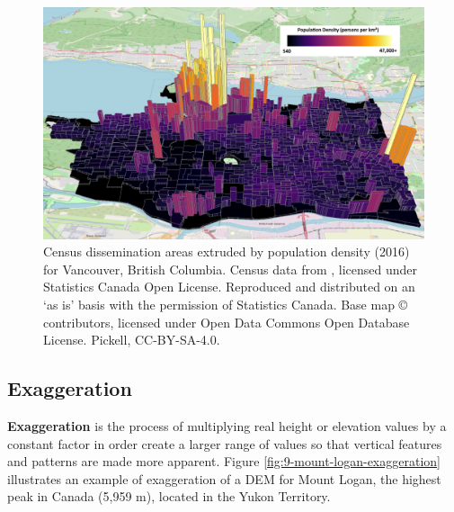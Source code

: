 \documentclass[
]{book}
\begin{document}
\begin{figure}
\includegraphics[width=0.75\linewidth]{images/09-vancouver-population-density-2016} \caption{Census dissemination areas extruded by population density (2016) for Vancouver, British Columbia. Census data from \citep{government_of_canada_focus_2017}, licensed under Statistics Canada Open License. Reproduced and distributed on an `as is' basis with the permission of Statistics Canada. Base map © \citep{openstreetmap_notitle_nodate} contributors, licensed under Open Data Commons Open Database License. Pickell, CC-BY-SA-4.0.}\label{fig:9-vancouver-population-density-2016}
\end{figure}

\subsection{Exaggeration}\label{exaggeration}

\textbf{Exaggeration} is the process of multiplying real height or elevation values by a constant factor in order create a larger range of values so that vertical features and patterns are made more apparent. Figure \ref{fig:9-mount-logan-exaggeration} illustrates an example of exaggeration of a DEM for Mount Logan, the highest peak in Canada (5,959 m), located in the Yukon Territory.
\end{document}
